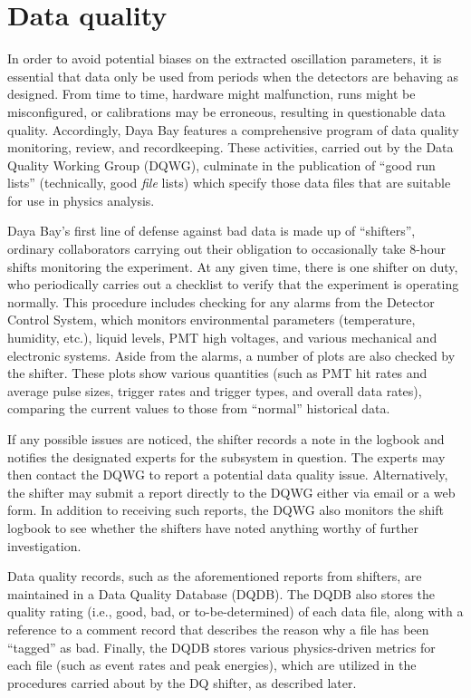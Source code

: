 \documentclass[../thesis.tex]{subfiles}
\begin{document}
\section{Data quality}
\label{sec:selDataQuality}

In order to avoid potential biases on the extracted oscillation parameters, it is essential that data only be used from periods when the detectors are behaving as designed. From time to time, hardware might malfunction, runs might be misconfigured, or calibrations may be erroneous, resulting in questionable data quality. Accordingly, Daya Bay features a comprehensive program of data quality monitoring, review, and recordkeeping. These activities, carried out by the Data Quality Working Group (DQWG), culminate in the publication of ``good run lists'' (technically, good \emph{file} lists) which specify those data files that are suitable for use in physics analysis.

Daya Bay's first line of defense against bad data is made up of ``shifters'', ordinary collaborators carrying out their obligation to occasionally take 8-hour shifts monitoring the experiment. At any given time, there is one shifter on duty, who periodically carries out a checklist to verify that the experiment is operating normally. This procedure includes checking for any alarms from the Detector Control System, which monitors environmental parameters (temperature, humidity, etc.), liquid levels, PMT high voltages, and various mechanical and electronic systems. Aside from the alarms, a number of plots are also checked by the shifter. These plots show various quantities (such as PMT hit rates and average pulse sizes, trigger rates and trigger types, and overall data rates), comparing the current values to those from ``normal'' historical data.

If any possible issues are noticed, the shifter records a note in the logbook and notifies the designated experts for the subsystem in question. The experts may then contact the DQWG to report a potential data quality issue. Alternatively, the shifter may submit a report directly to the DQWG either via email or a web form. In addition to receiving such reports, the DQWG also monitors the shift logbook to see whether the shifters have noted anything worthy of further investigation.

Data quality records, such as the aforementioned reports from shifters, are maintained in a Data Quality Database (DQDB). The DQDB also stores the quality rating (i.e., good, bad, or to-be-determined) of each data file, along with a reference to a comment record that describes the reason why a file has been ``tagged'' as bad. Finally, the DQDB stores various physics-driven metrics for each file (such as event rates and peak energies), which are utilized in the procedures carried about by the DQ shifter, as described later.
\end{document}
